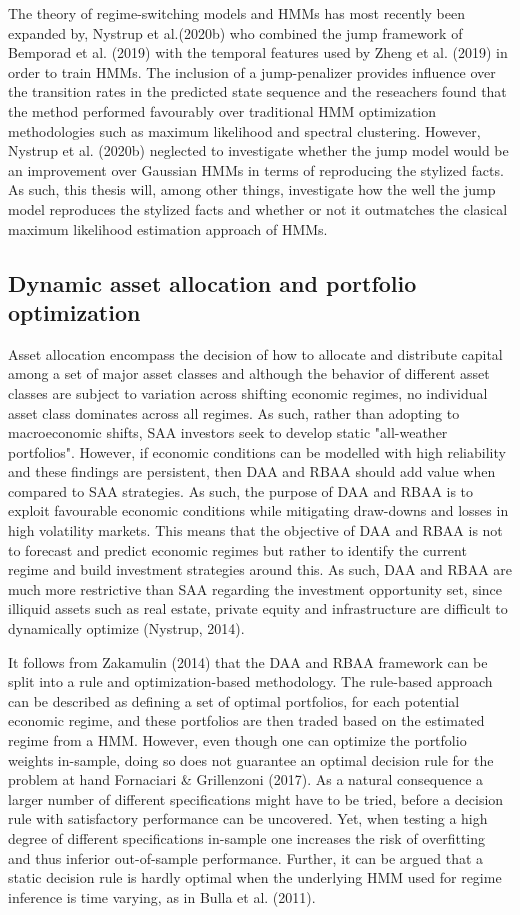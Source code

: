 The theory of regime-switching models and HMMs has most recently been expanded by, Nystrup et al.(2020b) who combined the jump framework of Bemporad et al. (2019) with the temporal features used by Zheng et al. (2019) in order to train HMMs. The inclusion of a jump-penalizer provides influence over the transition rates in the predicted state sequence and the reseachers found that the method performed favourably over traditional HMM optimization methodologies such as maximum likelihood and spectral clustering. However, Nystrup et al. (2020b) neglected to investigate whether the jump model would be an improvement over Gaussian HMMs in terms of reproducing the stylized facts. As such, this thesis will, among other things, investigate how the well the jump model reproduces the stylized facts and whether or not it outmatches the clasical maximum likelihood estimation approach of HMMs. 

\subsection{Dynamic asset allocation and portfolio optimization}
Asset allocation encompass the decision of how to allocate and distribute capital among a set of major asset classes and although the behavior of different asset classes are subject to variation across shifting economic regimes, no individual asset class dominates across all regimes. As such, rather than adopting to macroeconomic shifts, SAA investors seek to develop static "all-weather portfolios". However, if economic conditions can be modelled with high reliability and these findings are persistent, then DAA and RBAA should add value when compared to SAA strategies. As such, the purpose of DAA and RBAA is to exploit favourable economic conditions while mitigating draw-downs and losses in high volatility markets. This means that the objective of DAA and RBAA is not to forecast and predict economic regimes but rather to identify the current regime and build investment strategies around this. As such, DAA and RBAA are much more restrictive than SAA regarding the investment opportunity set, since illiquid assets such as real estate, private equity and infrastructure are difficult to dynamically optimize (Nystrup, 2014).

It follows from Zakamulin (2014) that the DAA and RBAA framework can be split into a rule and optimization-based methodology. The rule-based approach can be described as defining a set of optimal portfolios, for each potential economic regime, and these portfolios are then traded based on the estimated regime from a HMM. However, even though one can optimize the portfolio weights in-sample, doing so does not guarantee an optimal decision rule for the problem at hand Fornaciari \& Grillenzoni (2017). As a natural consequence a larger number of different specifications might have to be tried, before a decision rule with satisfactory performance can be uncovered. Yet, when testing a high degree of different specifications in-sample one increases the risk of overfitting and thus inferior out-of-sample performance. Further, it can be argued that a static decision rule is hardly optimal when the underlying HMM used for regime inference is time varying, as in Bulla et al. (2011).

